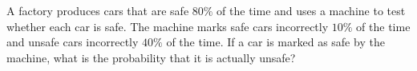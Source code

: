 A factory produces cars that are safe $80\%$ of the time and uses a machine to test whether each car is safe. The machine marks safe cars incorrectly $10\%$ of the time and unsafe cars incorrectly $40\%$ of the time. If a car is marked as safe by the machine, what is the probability that it is actually unsafe?
